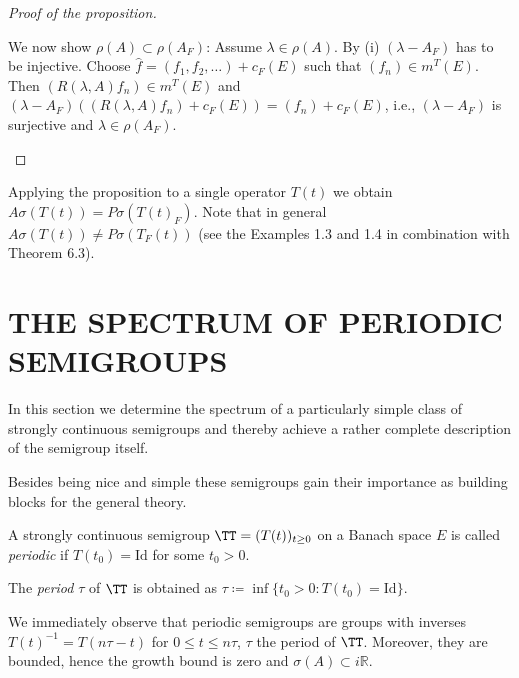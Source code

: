 \begin{proof}[Proof of the proposition]
\begin{enumerate}[(i)]
		We now show $\rho(A) \subset \rho(A_{F})$: Assume $\lambda \in \rho(A)$.
		By (i) $(\lambda-A_{F})$ has to be injective.
		Choose $\hat{f} = (f_{1},f_{2},\ldots) + c_{F}(E)$ such that $(f_{n}) \in m^{T}(E)$.
		Then $(R(\lambda,A)f_{n}) \in m^{T}(E)$ and $(\lambda-A_{F})((R(\lambda,A)f_{n})+c_{F}(E)) = (f_{n}) + c_{F}(E)$, i.e., $(\lambda-A_{F})$ is surjective and $\lambda \in \rho(A_{F})$.
	\end{enumerate}
\end{proof}


\newpage

Applying the proposition to a single operator $T(t)$ we obtain\\ $A\sigma(T(t)) = P\sigma(T(t)_{F})$.
Note that in general $A\sigma(T(t)) \neq P\sigma(T_{F}(t))$ (see the Examples 1.3 and 1.4 in combination with Theorem 6.3).

\section{THE SPECTRUM OF PERIODIC SEMIGROUPS}\label{sec:a3-5}

In this section we determine the spectrum of a particularly simple class of strongly continuous semigroups and thereby achieve a rather complete description of the semigroup itself.

Besides being nice and simple these semigroups gain their importance as building blocks for the general theory.

\begin{definition}\label{def:a3-5.1}
	
	A strongly continuous semigroup $\TT = (T(t))_{t \geq 0}$ on a Banach space $E$ is called \emph{periodic} if $T(t_{0}) = \text{Id}$ for some $t_{0} > 0$.
	
	The \emph{period} $\tau$ of $\TT$ is obtained as $\tau \coloneqq \inf\{t_{0} > 0 \colon T(t_{0}) = \text{Id}\}$.
\end{definition}

We immediately observe that periodic semigroups are groups with inverses \\
$T(t)^{-1} = T(n\tau-t)$ for $0 \leq t \leq n\tau$, $\tau$ the period of $\TT$.
Moreover, they are bounded, hence the growth bound is zero and $\sigma(A) \subset i\mathbb{R}$.

